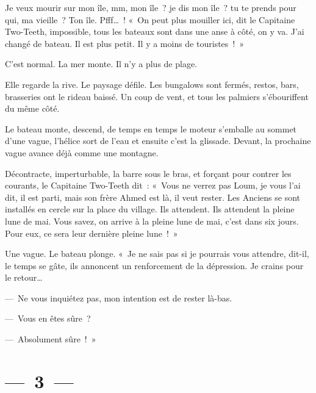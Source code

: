 \documentclass[french,twoside]{book} %
\begin{document}
\noindent Je veux mourir sur mon île, mm, mon île ? je dis mon île ? tu te prends pour qui, ma vieille ? Ton île. Pfff… ! « On peut plus mouiller ici, dit le Capitaine Two-Teeth, impossible, tous les bateaux sont dans une anse à côté, on y va. J’ai changé de bateau. Il est plus petit. Il y a moins de touristes ! »\par
C’est normal. La mer monte. Il n’y a plus de plage.\par
Elle regarde la rive. Le paysage défile. Les bungalows sont fermés, restos, bars, brasseries ont le rideau baissé. Un coup de vent, et tous les palmiers s’ébouriffent du même côté.\par
Le bateau monte, descend, de temps en temps le moteur s’emballe au sommet d’une vague, l’hélice sort de l’eau et ensuite c’est la glissade. Devant, la prochaine vague avance déjà comme une montagne.\par
Décontracte, imperturbable, la barre sous le bras, et forçant pour contrer les courants, le Capitaine Two-Teeth dit : « Vous ne verrez pas Loum, je vous l’ai dit, il est parti, mais son frère Ahmed est là, il veut rester. Les Anciens se sont installés en cercle sur la place du village. Ils attendent. Ils attendent la pleine lune de mai. Vous savez, on arrive à la pleine lune de mai, c’est dans six jours. Pour eux, ce sera leur dernière pleine lune ! »\par
Une vague. Le bateau plonge. « Je ne sais pas si je pourrais vous attendre, dit-il, le temps se gâte, ils annoncent un renforcement de la dépression. Je crains pour le retour…\par
— Ne vous inquiétez pas, mon intention est de rester là-bas.\par
— Vous en êtes sûre ?\par
— Absolument sûre ! »

\section[{— 3 —}]{— 3 —}
\renewcommand{\leftmark}{— 3 —}
\end{document}

